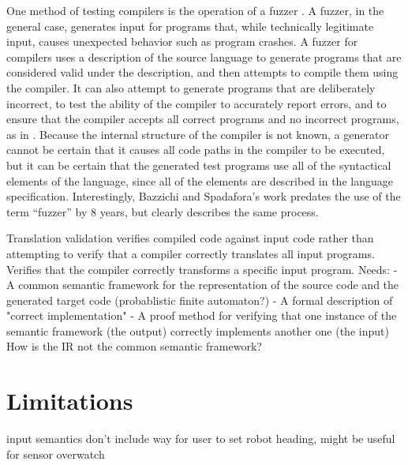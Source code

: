 One method of testing compilers is the operation of a fuzzer \citep{miller1990empirical}. A fuzzer, in the general case, generates input for programs that, while technically legitimate input, causes unexpected behavior such as program crashes. A fuzzer for compilers uses a description of the source language to generate programs that are considered valid under the description, and then attempts to compile them using the compiler. It can also attempt to generate programs that are deliberately incorrect, to test the ability of the compiler to accurately report errors, and to ensure that the compiler accepts all correct programs and no incorrect programs, as in \citep{bazzichi1982automatic}. 
Because the internal structure of the compiler is not known, a generator cannot be certain that it causes all code paths in the compiler to be executed, but it can be certain that the generated test programs use all of the syntactical elements of the language, since all of the elements are described in the language specification. Interestingly, Bazzichi and Spadafora's work predates the use of the term ``fuzzer'' by 8 years, but clearly describes the same process.

Translation validation \citep{pnueli1998translation}
verifies compiled code against input code rather than attempting to verify that a compiler correctly translates all input programs.
Verifies that the compiler correctly transforms a specific input program. 
Needs:
 - A common semantic framework for the representation of the source code and the generated target code (probablistic finite automaton?)
 - A formal description of "correct implementation"
 - A proof method for verifying that one instance of the semantic framework (the output) correctly implements another one (the input)
How is the IR not the common semantic framework?

\section{Limitations}

input semantics don't include way for user to set robot heading, might be useful for sensor overwatch
 



